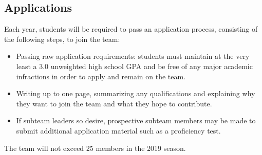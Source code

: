 \documentclass{proc}
\begin{document}
\subsection{Applications}
Each year, students will be required to pass an application process, consisting of the following steps, to join the team:
\begin{itemize}
  \item{Passing raw application requirements: students must maintain at the very least a 3.0 unweighted high school GPA and be free of any major academic infractions in order to apply and remain on the team.}
  \item{Writing up to one page, summarizing any qualifications and explaining why they want to join the team and what they hope to contribute.}
  \item{If subteam leaders so desire, prospective subteam members may be made to submit additional application material such as a proficiency test.}
\end{itemize}
The team will not exceed 25 members in the 2019 season.
\end{document}
